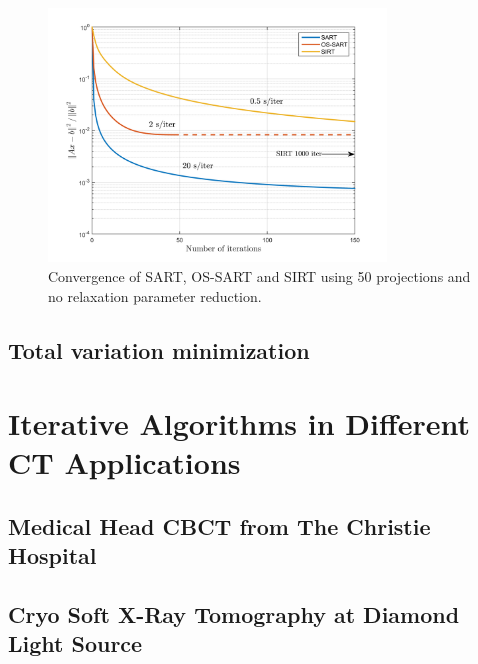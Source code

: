 \begin{figure}[H]
\begin{center}

\includegraphics[width=0.8\textwidth]{Applications/SARTtypes.png} 
\end{center}

\caption[Convergence of SART/OS-SART/SIRT]{\label{fig:SARTtypesconv} Convergence of SART, OS-SART and SIRT using 50 projections and no relaxation parameter reduction.} 
\end{figure}



\subsection{Total variation minimization}


\section{Iterative Algorithms in Different CT Applications}
\subsection{Medical Head CBCT from  The Christie Hospital}
\subsection{Cryo Soft X-Ray Tomography at Diamond Light Source}